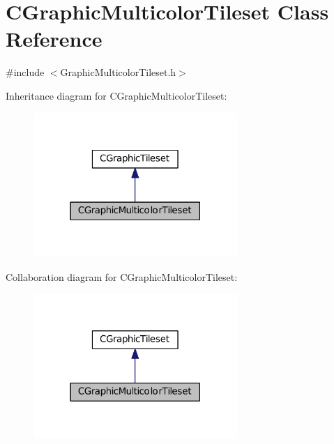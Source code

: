 \hypertarget{classCGraphicMulticolorTileset}{}\section{C\+Graphic\+Multicolor\+Tileset Class Reference}
\label{classCGraphicMulticolorTileset}


{\ttfamily \#include $<$Graphic\+Multicolor\+Tileset.\+h$>$}



Inheritance diagram for C\+Graphic\+Multicolor\+Tileset\+:
\nopagebreak
\begin{figure}[H]
\begin{center}
\leavevmode
\includegraphics[width=219pt]{classCGraphicMulticolorTileset__inherit__graph}
\end{center}
\end{figure}


Collaboration diagram for C\+Graphic\+Multicolor\+Tileset\+:
\nopagebreak
\begin{figure}[H]
\begin{center}
\leavevmode
\includegraphics[width=219pt]{classCGraphicMulticolorTileset__coll__graph}
\end{center}
\end{figure}
